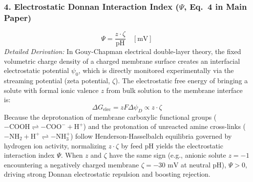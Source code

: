 \documentclass[11pt]{article}
\begin{document}
\subsubsection{4. Electrostatic Donnan Interaction Index ($\Psi$, Eq.~4 in Main Paper)}
\begin{equation}
\Psi = \frac{z \cdot \zeta}{\mathrm{pH}} \quad [\mathrm{mV}]
\label{eq:s_psi}
\end{equation}
\noindent\textit{Detailed Derivation:} In Gouy-Chapman electrical double-layer theory, the fixed volumetric charge density of a charged membrane surface creates an interfacial electrostatic potential $\psi_0$, which is directly monitored experimentally via the streaming potential (zeta potential, $\zeta$). The electrostatic free energy of bringing a solute with formal ionic valence $z$ from bulk solution to the membrane interface is:
\begin{equation}
\Delta G_{\mathrm{elec}} = z F \Delta \psi_D \propto z \cdot \zeta
\label{eq:s_elec_energy}
\end{equation}
Because the deprotonation of membrane carboxylic functional groups ($-\mathrm{COOH} \rightleftharpoons -\mathrm{COO}^- + \mathrm{H}^+$) and the protonation of unreacted amine cross-links ($-\mathrm{NH}_2 + \mathrm{H}^+ \rightleftharpoons -\mathrm{NH}_3^+$) follow Henderson-Hasselbalch equilibria governed by hydrogen ion activity, normalizing $z \cdot \zeta$ by feed $\mathrm{pH}$ yields the electrostatic interaction index $\Psi$. When $z$ and $\zeta$ have the same sign (e.g., anionic solute $z = -1$ encountering a negatively charged membrane $\zeta = -30\text{ mV}$ at neutral $\mathrm{pH}$), $\Psi > 0$, driving strong Donnan electrostatic repulsion and boosting rejection.
\end{document}
